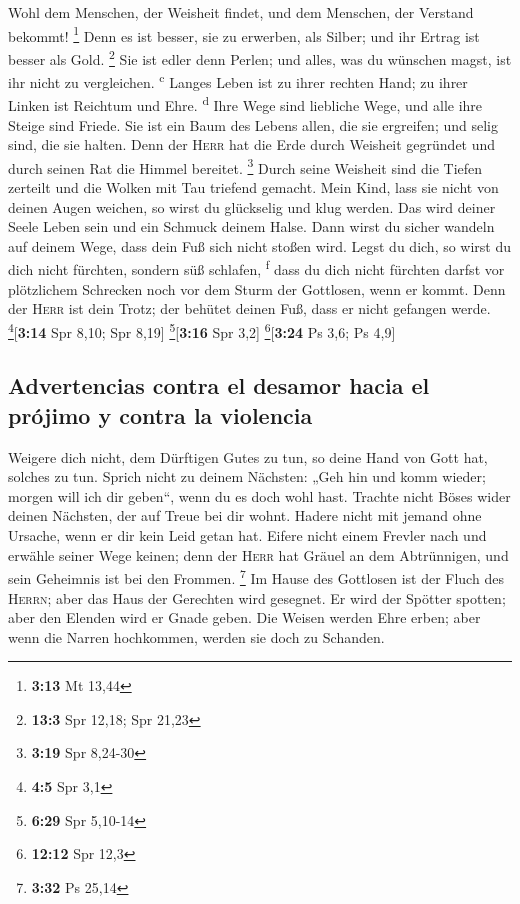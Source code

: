  Wohl dem Menschen, der Weisheit findet, und dem
Menschen, der Verstand bekommt! \footnote{\textbf{3:13} Mt 13,44}
 Denn es ist besser, sie zu erwerben, als Silber; und ihr
Ertrag ist besser als Gold. \footnote{\textbf{13:3} Spr 12,18; Spr 21,23}
 Sie ist edler denn Perlen; und alles, was du wünschen
magst, ist ihr nicht zu vergleichen. \textsuperscript{c} 
Langes Leben ist zu ihrer rechten Hand; zu ihrer Linken ist Reichtum und
Ehre. \textsuperscript{d}  Ihre Wege sind liebliche Wege,
und alle ihre Steige sind Friede.  Sie ist ein Baum des
Lebens allen, die sie ergreifen; und selig sind, die sie halten.
 Denn der \textsc{Herr} hat die Erde durch Weisheit
gegründet und durch seinen Rat die Himmel bereitet. \footnote{\textbf{3:19}
  Spr 8,24-30}  Durch seine Weisheit sind die Tiefen
zerteilt und die Wolken mit Tau triefend gemacht.  Mein
Kind, lass sie nicht von deinen Augen weichen, so wirst du glückselig
und klug werden.  Das wird deiner Seele Leben sein und
ein Schmuck deinem Halse.  Dann wirst du sicher wandeln
auf deinem Wege, dass dein Fuß sich nicht stoßen wird. 
Legst du dich, so wirst du dich nicht fürchten, sondern süß schlafen,
\textsuperscript{f}  dass du dich nicht fürchten darfst
vor plötzlichem Schrecken noch vor dem Sturm der Gottlosen, wenn er
kommt.  Denn der \textsc{Herr} ist dein Trotz; der
behütet deinen Fuß, dass er nicht gefangen werde.
\footnote{\textbf{4:5} Spr 3,1}{[}\textbf{3:14} Spr 8,10; Spr 8,19{]}
\footnote{\textbf{6:29} Spr 5,10-14}{[}\textbf{3:16} Spr 3,2{]}
\footnote{\textbf{12:12} Spr 12,3}{[}\textbf{3:24} Ps 3,6; Ps 4,9{]}

\hypertarget{advertencias-contra-el-desamor-hacia-el-pruxf3jimo-y-contra-la-violencia}{%
\subsection{Advertencias contra el desamor hacia el prójimo y contra la
violencia}\label{advertencias-contra-el-desamor-hacia-el-pruxf3jimo-y-contra-la-violencia}}

 Weigere dich nicht, dem Dürftigen Gutes zu tun, so deine
Hand von Gott hat, solches zu tun.  Sprich nicht zu
deinem Nächsten: „Geh hin und komm wieder; morgen will ich dir geben``,
wenn du es doch wohl hast.  Trachte nicht Böses wider
deinen Nächsten, der auf Treue bei dir wohnt.  Hadere
nicht mit jemand ohne Ursache, wenn er dir kein Leid getan hat.
 Eifere nicht einem Frevler nach und erwähle seiner Wege
keinen;  denn der \textsc{Herr} hat Gräuel an dem
Abtrünnigen, und sein Geheimnis ist bei den Frommen. \footnote{\textbf{3:32}
  Ps 25,14}  Im Hause des Gottlosen ist der Fluch des
\textsc{Herrn}; aber das Haus der Gerechten wird gesegnet.
 Er wird der Spötter spotten; aber den Elenden wird er
Gnade geben.  Die Weisen werden Ehre erben; aber wenn die
Narren hochkommen, werden sie doch zu Schanden.

